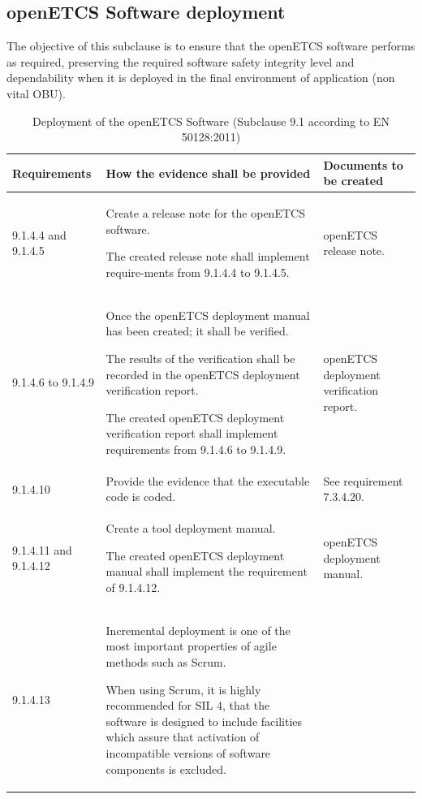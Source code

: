 \documentclass{template/openetcs_report}
\begin{document}
\subsection{openETCS Software deployment}
\begin{flushleft}
The objective of this subclause is to ensure that the openETCS software performs as required, preserving the required software safety integrity level and dependability when it is deployed in the final environment of application (non vital OBU).
\end{flushleft}
{\footnotesize\sffamily\centering
\begin{longtable}{|p{2cm}|p{9cm}|p{3cm}|}
\caption{Deployment of the openETCS Software (Subclause 9.1 according to EN 50128:2011)}\\
\hline
\bfseries Requirements & \bfseries How the evidence shall be provided & \bfseries Documents to be created\\
\hline
\hline
\endhead
\hline
\endfoot

9.1.4.4 and 9.1.4.5 & Create a release note for the openETCS software.

The created release note shall implement require-ments from 9.1.4.4 to 9.1.4.5.
& openETCS release note.\\ 
\hline
9.1.4.6 to 9.1.4.9 & Once the openETCS deployment manual has been created; it shall be verified.

The results of the verification shall be recorded in the openETCS deployment verification report.

The created openETCS deployment verification report shall implement requirements from 9.1.4.6 to 9.1.4.9.
& openETCS deployment verification report.\\ 
\hline
9.1.4.10 & Provide the evidence that the executable code is coded. 
& See requirement 7.3.4.20.\\ 
\hline
9.1.4.11 and 9.1.4.12 & Create a tool deployment manual.

The created openETCS deployment manual shall implement the requirement of 9.1.4.12.& openETCS deployment manual.\\ 
\hline
9.1.4.13 & Incremental deployment is one of the most important properties of agile methods such as Scrum.

When using Scrum, it is highly recommended for SIL 4, that the software is designed to include facilities which assure that activation of incompatible versions of software components is excluded.


\end{longtable}}
\end{document}
